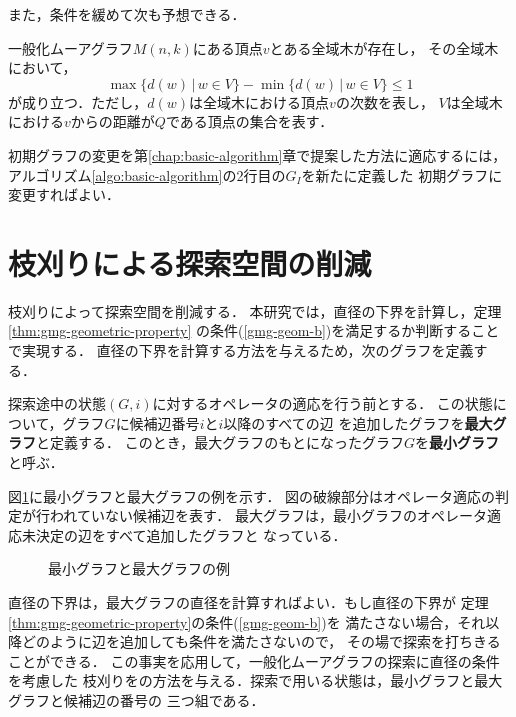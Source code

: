 また，条件を緩めて次も予想できる．

\begin{conjecture}\rm
  \label{conj:spanning-tree-2}
  一般化ムーアグラフ$M(n,k)$にある頂点$v$とある全域木が存在し，
  その全域木において，
  \[ \max\{d(w)\,|\,w\in V\}-\min\{d(w)\,|\,w\in V\}\leq 1 \]
  が成り立つ．ただし，$d(w)$は全域木における頂点$v$の次数を表し，
  $V$は全域木における$v$からの距離が$Q$である頂点の集合を表す．
\end{conjecture}

初期グラフの変更を第\ref{chap:basic-algorithm}章で提案した方法に適応するには，
アルゴリズム\ref{algo:basic-algorithm}の2行目の$G_I$を新たに定義した
初期グラフに変更すればよい．

\section{枝刈りによる探索空間の削減}
\label{sect:reduce-by-prune}
枝刈りによって探索空間を削減する．
本研究では，直径の下界を計算し，定理\ref{thm:gmg-geometric-property}
の条件(\ref{gmg-geom-b})を満足するか判断することで実現する．
直径の下界を計算する方法を与えるため，次のグラフを定義する．
\begin{definition}\rm
  探索途中の状態$(G,i)$に対するオペレータの適応を行う前とする．
  この状態について，グラフ$G$に候補辺番号$i$と$i$以降のすべての辺
  を追加したグラフを\textbf{最大グラフ}と定義する．
  このとき，最大グラフのもとになったグラフ$G$を\textbf{最小グラフ}と呼ぶ．
\end{definition}

\begin{example}\rm
  図\ref{fig:min-max-graph}に最小グラフと最大グラフの例を示す．
  図の破線部分はオペレータ適応の判定が行われていない候補辺を表す．
  最大グラフは，最小グラフのオペレータ適応未決定の辺をすべて追加したグラフと
  なっている．
\end{example}

\begin{figure}
  \centering
  \hfill
  \caption{最小グラフと最大グラフの例}
  \label{fig:min-max-graph}
\end{figure}

直径の下界は，最大グラフの直径を計算すればよい．もし直径の下界が
定理\ref{thm:gmg-geometric-property}の条件(\ref{gmg-geom-b})を
満たさない場合，それ以降どのように辺を追加しても条件を満たさないので，
その場で探索を打ちきることができる．
この事実を応用して，一般化ムーアグラフの探索に直径の条件を考慮した
枝刈りをの方法を与える．探索で用いる状態は，最小グラフと最大グラフと候補辺の番号の
三つ組である．

